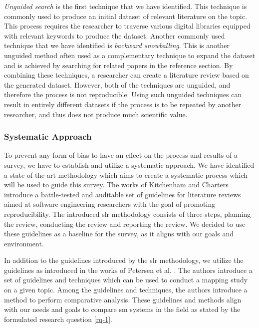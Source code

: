 

\textit{Unguided search} is the first technique that we have identified. This technique is commonly used to produce an initial dataset of relevant literature on the topic. This process requires the researcher to traverse various digital libraries equipped with relevant keywords to produce the dataset. Another commonly used technique that we have identified is \textit{backward snowballing}. This is another unguided method often used as a complementary technique to expand the dataset and is achieved by searching for related papers in the reference section. By combining these techniques, a researcher can create a literature review based on the generated dataset. However, both of the techniques are unguided, and therefore the process is not reproducible. Using such unguided techniques can result in entirely different datasets if the process is to be repeated by another researcher, and thus does not produce much scientific value. 

\subsubsection{Systematic Approach}
\label{sec:survey:methodology:strategy:systematic}

To prevent any form of bias to have an effect on the process and results of a survey, we have to establish and utilize a systematic approach. We have identified a state-of-the-art methodology which aims to create a systematic process which will be used to guide this survey. The works of Kitchenham and Charters \cite{Kitchenham2007} introduce a battle-tested and auditable set of guidelines for literature reviews aimed at software engineering researchers  with the goal of promoting reproducibility. The introduced \gls{slr} methodology consists of three steps, planning the review, conducting the review and reporting the review. We decided to use these guidelines as a baseline for the survey, as it aligns with our goals and environment.

In addition to the guidelines introduced by the \gls{slr} methodology, we utilize the guidelines as introduced in the works of Petersen et al. \cite{Petersen2008, Petersen2015}. The authors introduce a set of guidelines and techniques which can be used to conduct a mapping study on a given topic. Among the guidelines and techniques, the authors introduce a method to perform comparative analysis. These guidelines and methods align with our needs and goals to compare \gls{sm} systems in the field as stated by the formulated research question \ref{rq-1}. 

